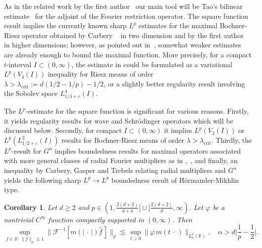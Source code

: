 \documentclass[11pt]{amsart}
\newtheorem{corollary}[theorem]{Corollary}
\theoremstyle{definition}
\numberwithin{theorem}{section}
\numberwithin{definition}{section}
\newcommand{\note}[1]{\footnote{\texttt{\Small #1}}}
\def\lc{\lesssim}
\def\eps{\varepsilon}
\def\la{\lambda}             \def\La{\Lambda}
\def\bbR{{\mathbb {R}}}
\def\cF{{\mathcal {F}}}
\def\cS{{\mathcal {S}}}
\begin{document}
As in the related work by the first author~\cite{le}
our  main tool  will be Tao's bilinear estimate~\cite{ta}
 for the adjoint of the Fourier restriction operator. The   square function
 result
implies  the currently known sharp $L^p$
estimates for the
maximal Bochner-Riesz operator
obtained by Carbery  ~\cite{ca} in two dimension  and by the first author ~\cite{le} in higher dimensions; however,
as pointed out in~\cite{le}, somewhat weaker  estimates are
already enough to bound  the maximal  function. More precisely,
for a   compact $t$-interval $I\subset  (0,\infty)$, the  estimate in
\cite{le} could be formulated as a  variational $L^p(V_4(I))$ inequality for Riesz means of order
 $\la> \la_{\text{crit}}:=d(1/2-1/p)-1/2$,
or a slightly better
 regularity  result involving the Sobolev space $L^4_{1/4+\eps}(I)$.


The  $L^p$-estimate  for the square function
 is  significant for various reasons.
Firstly,
it yields  regularity results for wave and Schr\"odinger operators
which  will be discussed  below. Secondly,
  for compact $I\subset (0,\infty)$
it implies   $L^p(V_2(I))$ or
$L^p(L^2_{1/2+\eps}(I))$ results for  Bochner-Riesz
means of order $\la>\la_{\text{crit}}$.
Thirdly, the $L^p$-result for $G^\alpha$ implies
 boundedness results  for maximal operators associated with
 more general classes of radial Fourier multipliers as in
\cite{caesc},~\cite{dt}, and  finally,
 an inequality by Carbery, Gasper and Trebels
\cite{cgt} relating radial multipliers and  $G^\alpha$
 yields the following  sharp $L^p\to L^p$ boundedness
result of H\"ormander-Mikhlin type.
\begin{corollary}\label{Lpmultiplierresults}
Let $d\ge 2$ and
$p\in(1, \frac{2(d+2)}{d+4}]\cup [\frac{2(d+2)}{d},\infty)$.
%
Let $\varphi$ be a
nontrivial $C^\infty$ function compactly supported in
$(0,\infty)$. Then
$$
\sup_{f\in\cS:\, \|f\|_p\le 1}
 \big\|\cF^{-1}[ m(|\,\cdot\,|) \widehat f \,]\big\|_p
  \lc\, \sup_{t>0} \|\varphi\,
 m(t\,\cdot\,)\|_{L^2_{\alpha}(\bbR)},\quad \alpha> d\Big|\frac 1p-\frac 12\Big|.
$$

\end{corollary}
\end{document}
